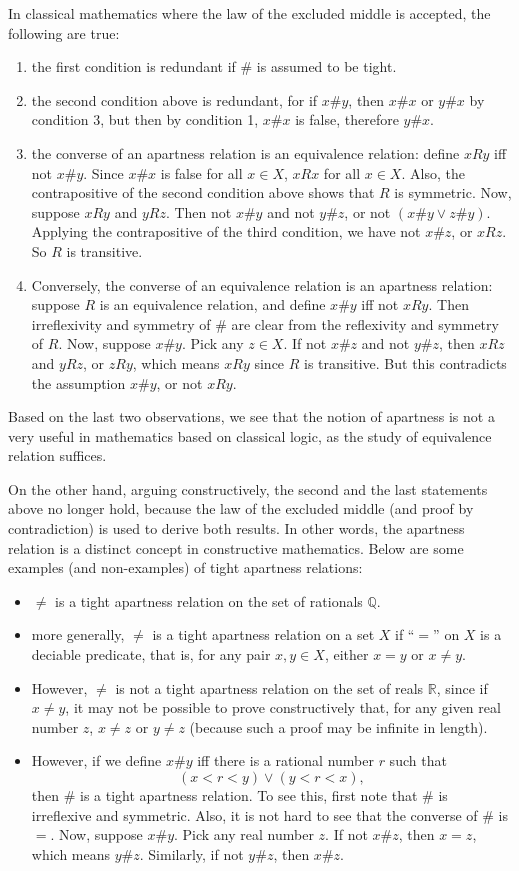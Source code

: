 \documentclass[12pt]{article}
\begin{document}
In classical mathematics where the law of the excluded middle is accepted, the following are true:
\begin{enumerate}
\item the first condition is redundant if $\#$ is assumed to be tight.
\item the second condition above is redundant, for if $x\# y$, then $x\# x$ or $y\# x$ by condition 3, but then by condition 1, $x \# x$ is false, therefore $y\# x$.  
\item the converse of an apartness relation is an equivalence relation: define $x R y$ iff not $x \# y$.  Since $x \# x$ is false for all $x \in X$, $x R x$ for all $x\in X$.  Also, the contrapositive of the second condition above shows that $R$ is symmetric.  Now, suppose $x R y$ and $y R z$.  Then not $x \# y$ and not $y \# z$, or not $(x \# y \lor z \# y)$.  Applying the contrapositive of the third condition, we have not $x \# z$, or $x R z$.  So $R$ is transitive.
\item Conversely, the converse of an equivalence relation is an apartness relation: suppose $R$ is an equivalence relation, and define $x \# y$ iff not $x R y$.  Then irreflexivity and symmetry of $\#$ are clear from the reflexivity and symmetry of $R$.  Now, suppose $x \# y$.  Pick any $z\in X$.  If not $x \# z$ and not $y \# z$, then $x R z$ and $y R z$, or $z R y$, which means $x R y$ since $R$ is transitive.  But this contradicts the assumption $x \# y$, or not $x R y$.
\end{enumerate}
Based on the last two observations, we see that the notion of apartness is not a very useful in mathematics based on classical logic, as the study of equivalence relation suffices.

On the other hand, arguing constructively, the second and the last statements above no longer hold, because the law of the excluded middle (and proof by contradiction) is used to derive both results.  In other words, the apartness relation is a distinct concept in constructive mathematics.  Below are some examples (and non-examples) of tight apartness relations:
\begin{itemize}
\item $\ne$ is a tight apartness relation on the set of rationals $\mathbb{Q}$.
\item more generally, $\ne$ is a tight apartness relation on a set $X$ if ``$=$'' on $X$ is a deciable predicate, that is, for any pair $x,y \in X$, either $x=y$ or $x\ne y$.
\item However, $\ne$ is not a tight apartness relation on the set of reals $\mathbb{R}$, since if $x\ne y$, it may not be possible to prove constructively that, for any given real number $z$, $x\ne z$ or $y\ne z$ (because such a proof may be infinite in length).  
\item However, if we define $x\# y$ iff there is a rational number $r$ such that $$(x<r<y)\lor (y<r<x),$$ then $\#$ is a tight apartness relation.  To see this, first note that $\#$ is irreflexive and symmetric.  Also, it is not hard to see that the converse of $\#$ is $=$.  Now, suppose $x\#y$.  Pick any real number $z$.  If not $x\#z$, then $x=z$, which means $y\#z$.  Similarly, if not $y\#z$, then $x\#z$.
\end{itemize}

\end{document}
